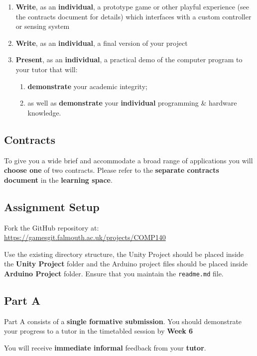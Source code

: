 \documentclass{../../fal_assignment}
\begin{document}
	\begin{enumerate}[label=(\Alph*)]
		\item \textbf{Write}, as an \textbf{individual}, a prototype game or other playful experience (see the contracts document for details) which interfaces with a custom controller or sensing system
		\item \textbf{Write}, as an \textbf{individual}, a final version of your project
		\item \textbf{Present}, as an \textbf{individual}, a practical demo of the computer program to your tutor that will:
		\begin{enumerate}[label=\roman*.]
			\item \textbf{demonstrate} your academic integrity;
			\item as well as \textbf{demonstrate} your \textbf{individual} programming \& hardware knowledge.
		\end{enumerate}
	\end{enumerate}
	\subsection*{Contracts}
	To give you a wide brief and accommodate a broad range of applications you will \textbf{choose one} of two contracts. Please refer to the \textbf{separate contracts document} in the \textbf{learning space}.

	
	\subsection*{Assignment Setup}
	Fork the GitHub repository at:
	\indent \url{https://gamesgit.falmouth.ac.uk/projects/COMP140}
	
	Use the existing directory structure, the Unity Project should be placed inside the \textbf{Unity Project} folder and the Arduino project files should be placed inside \textbf{Arduino Project} folder. Ensure that you maintain the \texttt{readme.md} file.
	
	\subsection*{Part A}
	
	Part A consists of a \textbf{single formative submission}. You should demonstrate your progress to a tutor in the timetabled session by \textbf{Week 6}
	
	You will receive \textbf{immediate informal} feedback from your \textbf{tutor}.
	
\end{document}

